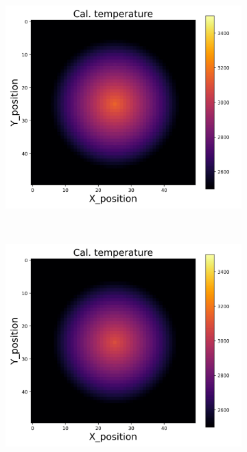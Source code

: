 {\begin{figure}[h]
\begin{minipage}{\textwidth}
\begin{subfigure}{0.27\textwidth}
        \end{subfigure}
        \begin{subfigure}{0.27\textwidth}
            \centering
            \includegraphics[width=\textwidth]{figures/raw_data/21/T3500/exp/T_cal.jpg}
        \end{subfigure}
    \end{minipage}\\
    \begin{minipage}{\textwidth}
        \centering
        \begin{subfigure}{0.27\textwidth}
            \centering
            \includegraphics[width=\textwidth]{figures/raw_data/22/T3500/exp/T_cal.jpg}

\end{subfigure}
\end{minipage}
\end{figure}}
